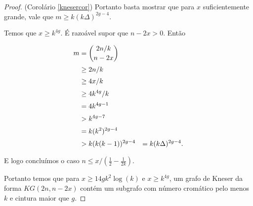 \begin{proof}{(Corolário \ref{knesercor})}
Portanto basta mostrar que para $x$ suficientemente grande, vale que $m \geq k(k\Delta)^{2g-4}$.

Temos que $x\geq k^{4g}$. É razoável supor que $n-2x > 0$. Então

\begin{equation*}
\setlength{\jot}{5pt}
\begin{aligned}
m &= \binom{2n/k}{n-2x}\\
&\geq 2n/k\\
&\geq 4x/k\\
&\geq 4k^{4g}/k\\
&= 4k^{4g-1}\\
&> k^{4g-7}\\
&= k(k^2)^{2g-4}\\
&> k(k(k-1))^{2g-4}&= k(k\Delta)^{2g-4}.
\end{aligned}
\end{equation*}

E logo concluímos o caso $n \leq x/(\frac{1}{2} - \frac{1}{2k})$.

Portanto temos que para $x \geq 14gk^2\log(k)$ e $x\geq k^{4g}$, um grafo de Kneser da forma $KG(2n,n-2x)$ contém um subgrafo com número cromático pelo menos $k$ e cintura maior que $g$.





\end{proof}

